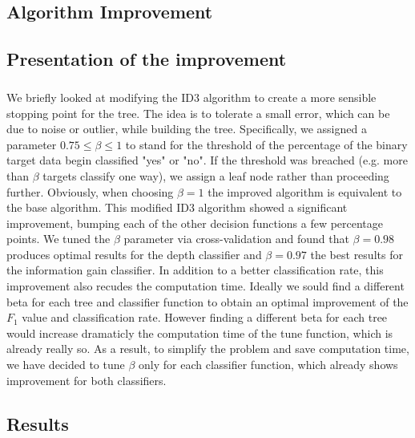 \documentclass[a4paper,12pt,oneside,final]{report}
\begin{document}
\begin{appendices}
\chapter{Algorithm Improvement}
\section{Presentation of the improvement}
\paragraph{}
\label{ch:improvedalgo}
We briefly looked at modifying the ID3 algorithm to create a more sensible stopping point for the tree. The idea is to tolerate a small error, which can be due to noise or outlier, while building the tree. Specifically, we assigned a parameter $0.75 \leq \beta\leq 1$ to stand for the threshold of the percentage of the binary target data begin classified "yes" or "no".  If the threshold was breached (e.g. more than $\beta$ targets classify one way), we assign a leaf node rather than proceeding further. Obviously, when choosing $\beta=1$ the improved algorithm is equivalent to the base algorithm. This modified ID3 algorithm showed a significant improvement, bumping each of the other decision functions a few percentage points.  We tuned the $\beta$ parameter via cross-validation and found that $\beta = 0.98$ produces optimal results for the depth classifier and $\beta=0.97$ the best results for the information gain classifier. In addition to a better classification rate, this improvement also recudes the computation time. Ideally we sould find a different beta for each tree and classifier function to obtain an optimal improvement of the $F_1$ value and classification rate. However finding a different beta for each tree would increase dramaticly the computation time of the tune function, which is already really so. As a result, to simplify the problem and save computation time, we have decided to tune $\beta$ only for each classifier function, which already shows improvement for both classifiers.

\section{Results}

\end{appendices}
\end{document}
